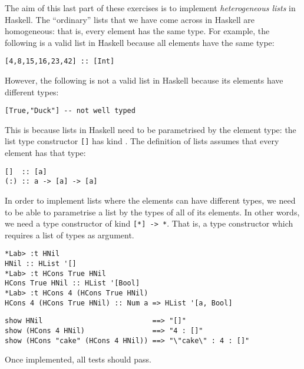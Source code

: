 The aim of this last part of these exercises is to implement \emph{heterogeneous lists} in Haskell. The ``ordinary'' lists that we have come across in Haskell are homogeneous: that is, every element has the same type. For example, the following is a valid list in Haskell because all elements have the same type:
\begin{verbatim}
[4,8,15,16,23,42] :: [Int]
\end{verbatim}  
However, the following is not a valid list in Haskell because its elements have different types:
\begin{verbatim}
[True,"Duck"] -- not well typed
\end{verbatim} 
This is because lists in Haskell need to be parametrised by the element type: the list type constructor \texttt{\small []} has kind \haskellIn{* -> *}. The definition of lists assumes that every element has that type:
\begin{verbatim}
[]  :: [a]
(:) :: a -> [a] -> [a]
\end{verbatim} 
In order to implement lists where the elements can have different types, we need to be able to parametrise a list by the types of all of its elements. In other words, we need a type constructor of kind \texttt{\small [*] -> *}. That is, a type constructor which requires a list of types as argument.

\begin{verbatim}
*Lab> :t HNil
HNil :: HList '[]
*Lab> :t HCons True HNil
HCons True HNil :: HList '[Bool]
*Lab> :t HCons 4 (HCons True HNil)
HCons 4 (HCons True HNil) :: Num a => HList '[a, Bool]
\end{verbatim}


\begin{verbatim}
show HNil                          ==> "[]"
show (HCons 4 HNil)                ==> "4 : []"
show (HCons "cake" (HCons 4 HNil)) ==> "\"cake\" : 4 : []"
\end{verbatim}
Once implemented, all tests should pass.

